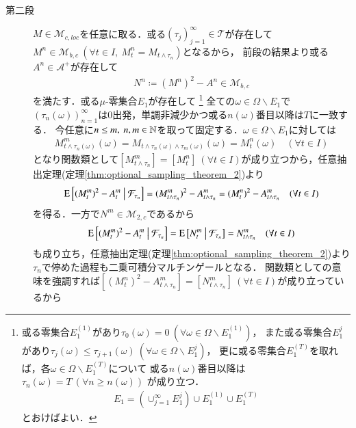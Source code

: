 \begin{prf}
\begin{description}
			\item[第二段]
				$M \in \mathcal{M}_{c,loc}$を任意に取る．或る$(\tau_j)_{j=1}^{\infty} \in \mathcal{T}$が存在して
				$M^n \in \mathcal{M}_{b,c}\ (\forall t \in I,\ M_t^n = M_{t \wedge \tau_n})$となるから，
				前段の結果より或る$A^n \in \mathcal{A}^+$が存在して
				\begin{align}
					N^n \coloneqq (M^n)^2 - A^n \in \mathcal{M}_{b,c}
				\end{align}
				を満たす．或る$\mu$-零集合$E_1$が存在して
				\footnote{
					或る零集合$E_1^{(1)}$があり$\tau_0(\omega) = 0\ (\forall \omega \in \Omega \backslash E_1^{(1)})$，
					また或る零集合$E_1^j$があり$\tau_j(\omega) \leq \tau_{j+1}(\omega)\ (\forall \omega \in \Omega \backslash E_1^j)$，
					更に或る零集合$E_1^{(T)}$を取れば，各$\omega \in \Omega \backslash E_1^{(T)}$について
					或る$n(\omega)$番目以降は$\tau_n(\omega) = T\ (\forall n \geq n(\omega))$
					が成り立つ．
					\begin{align}
						E_1 = \left( \cup_{j=1}^{\infty} E_1^j \right) \cup E_1^{(1)} \cup E_1^{(T)}
					\end{align}
					とおけばよい．
				}
				全ての$\omega \in \Omega \backslash E_1$で$(\tau_n(\omega))_{n=1}^{\infty}$は$0$出発，単調非減少かつ或る$n(\omega)$番目以降は$T$に一致する．
				今任意に$n \leq m,\ n,m \in \mathbb{N}$を取って固定する．$\omega \in \Omega \backslash E_1$に対しては
				\begin{align}
					M_{t \wedge \tau_n(\omega)}^m(\omega) = M_{t \wedge \tau_n(\omega) \wedge \tau_m(\omega)}(\omega) = M_t^n(\omega) \quad (\forall t \in I)
				\end{align}
				となり関数類として$[M_{t \wedge \tau_n}^m] = [M_t^n]\ (\forall t \in I)$が成り立つから，任意抽出定理(定理\ref{thm:optional_sampling_theorem_2})より
				\begin{align}
					\operatorname{E} \left[ (M_t^m)^2 - A_t^m \ \middle|\ \mathcal{F}_{\tau_n} \right] = (M_{t \wedge \tau_n}^m)^2 - A_{t \wedge \tau_n}^m = (M_t^n)^2 - A_{t \wedge \tau_n}^m
					\quad (\forall t \in I)
				\end{align}
				を得る．一方で$N^m \in \mathcal{M}_{2,c}$であるから
				\begin{align}
					\operatorname{E} \left[ (M_t^m)^2 - A_t^m \ \middle|\ \mathcal{F}_{\tau_n} \right] = \operatorname{E} \left[ N_t^m \ \middle|\ \mathcal{F}_{\tau_n} \right] = N_{t \wedge \tau_n}^m \quad (\forall t \in I)
				\end{align}
				も成り立ち，任意抽出定理(定理\ref{thm:optional_sampling_theorem_2})より$\tau_n$で停めた過程も二乗可積分マルチンゲールとなる．
				関数類としての意味を強調すれば$[(M_t^n)^2 - A_{t \wedge \tau_n}^m] = [N_{t \wedge \tau_n}^m]\ (\forall t \in I)$が成り立っているから

\end{description}
\end{prf}
